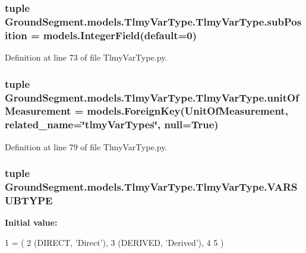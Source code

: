 \subsubsection[{sub\+Position}]{\setlength{\rightskip}{0pt plus 5cm}tuple Ground\+Segment.\+models.\+Tlmy\+Var\+Type.\+Tlmy\+Var\+Type.\+sub\+Position = models.\+Integer\+Field(default=0)\hspace{0.3cm}{\ttfamily [static]}}\label{class_ground_segment_1_1models_1_1_tlmy_var_type_1_1_tlmy_var_type_a5058fd500a0d206e5442dd8d6b5c038c}


Definition at line 73 of file Tlmy\+Var\+Type.\+py.

\hypertarget{class_ground_segment_1_1models_1_1_tlmy_var_type_1_1_tlmy_var_type_aaef1f4bce93820f037c7e586170fb378}{}
\subsubsection[{unit\+Of\+Measurement}]{\setlength{\rightskip}{0pt plus 5cm}tuple Ground\+Segment.\+models.\+Tlmy\+Var\+Type.\+Tlmy\+Var\+Type.\+unit\+Of\+Measurement = models.\+Foreign\+Key({\bf Unit\+Of\+Measurement}, related\+\_\+name=\char`\"{}tlmy\+Var\+Types\char`\"{}, null=True)\hspace{0.3cm}{\ttfamily [static]}}\label{class_ground_segment_1_1models_1_1_tlmy_var_type_1_1_tlmy_var_type_aaef1f4bce93820f037c7e586170fb378}


Definition at line 79 of file Tlmy\+Var\+Type.\+py.

\hypertarget{class_ground_segment_1_1models_1_1_tlmy_var_type_1_1_tlmy_var_type_a4d07d8c0064f8f2d2edbfb5b53001d9b}{}
\subsubsection[{V\+A\+R\+S\+U\+B\+T\+Y\+P\+E}]{\setlength{\rightskip}{0pt plus 5cm}tuple Ground\+Segment.\+models.\+Tlmy\+Var\+Type.\+Tlmy\+Var\+Type.\+V\+A\+R\+S\+U\+B\+T\+Y\+P\+E\hspace{0.3cm}{\ttfamily [static]}}\label{class_ground_segment_1_1models_1_1_tlmy_var_type_1_1_tlmy_var_type_a4d07d8c0064f8f2d2edbfb5b53001d9b}
{\bfseries Initial value\+:}
\begin{DoxyCode}
1 = (
2         (DIRECT, \textcolor{stringliteral}{'Direct'}),
3         (DERIVED, \textcolor{stringliteral}{'Derived'}),
4         
5     )
\end{DoxyCode}



